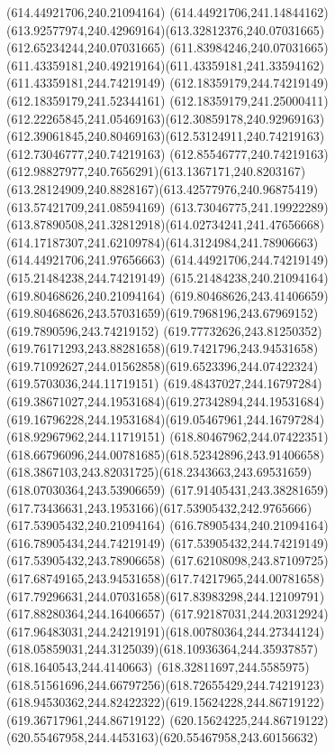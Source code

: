 {{	\moveto(614.44921706,240.21094164)
	\lineto(614.44921706,241.14844162)
	\curveto(613.92577974,240.42969164)(613.32812376,240.07031665)(612.65234244,240.07031665)
	\curveto(611.83984246,240.07031665)(611.43359181,240.49219164)(611.43359181,241.33594162)
	\lineto(611.43359181,244.74219149)
	\lineto(612.18359179,244.74219149)
	\lineto(612.18359179,241.52344161)
	\curveto(612.18359179,241.25000411)(612.22265845,241.05469163)(612.30859178,240.92969163)
	\curveto(612.39061845,240.80469163)(612.53124911,240.74219163)(612.73046777,240.74219163)
	\curveto(612.85546777,240.74219163)(612.98827977,240.7656291)(613.1367171,240.8203167)
	\curveto(613.28124909,240.8828167)(613.42577976,240.96875419)(613.57421709,241.08594169)
	\curveto(613.73046775,241.19922289)(613.87890508,241.32812918)(614.02734241,241.47656668)
	\curveto(614.17187307,241.62109784)(614.3124984,241.78906663)(614.44921706,241.97656663)
	\lineto(614.44921706,244.74219149)
	\lineto(615.21484238,244.74219149)
	\lineto(615.21484238,240.21094164)
	\closepath
	\moveto(619.80468626,240.21094164)
	\lineto(619.80468626,243.41406659)
	\curveto(619.80468626,243.57031659)(619.7968196,243.67969152)(619.7890596,243.74219152)
	\curveto(619.77732626,243.81250352)(619.76171293,243.88281658)(619.7421796,243.94531658)
	\curveto(619.71092627,244.01562858)(619.6523396,244.07422324)(619.5703036,244.11719151)
	\curveto(619.48437027,244.16797284)(619.38671027,244.19531684)(619.27342894,244.19531684)
	\curveto(619.16796228,244.19531684)(619.05467961,244.16797284)(618.92967962,244.11719151)
	\curveto(618.80467962,244.07422351)(618.66796096,244.00781685)(618.52342896,243.91406658)
	\curveto(618.3867103,243.82031725)(618.2343663,243.69531659)(618.07030364,243.53906659)
	\curveto(617.91405431,243.38281659)(617.73436631,243.1953166)(617.53905432,242.9765666)
	\lineto(617.53905432,240.21094164)
	\lineto(616.78905434,240.21094164)
	\lineto(616.78905434,244.74219149)
	\lineto(617.53905432,244.74219149)
	\lineto(617.53905432,243.78906658)
	\curveto(617.62108098,243.87109725)(617.68749165,243.94531658)(617.74217965,244.00781658)
	\curveto(617.79296631,244.07031658)(617.83983298,244.12109791)(617.88280364,244.16406657)
	\curveto(617.92187031,244.20312924)(617.96483031,244.24219191)(618.00780364,244.27344124)
	\curveto(618.05859031,244.3125039)(618.10936364,244.35937857)(618.1640543,244.4140663)
	\curveto(618.32811697,244.5585975)(618.51561696,244.66797256)(618.72655429,244.74219123)
	\curveto(618.94530362,244.82422322)(619.15624228,244.86719122)(619.36717961,244.86719122)
	\curveto(620.15624225,244.86719122)(620.55467958,244.4453163)(620.55467958,243.60156632)
}}

